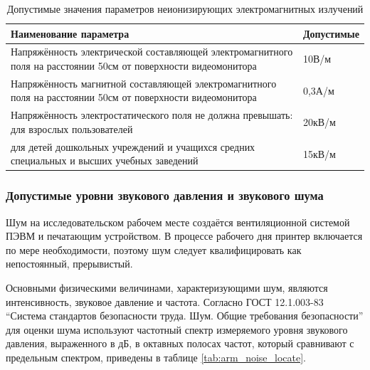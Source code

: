 \begin{table}[h]
\begin{longtable}[h!]{|m{}|m{}|}
\caption{Допустимые значения параметров неионизирующих электромагнитных излучений}
\label{tab:min_neoinige_elwave}
\\ \hline
Наименование параметра & Допустимые \\ \hline
Напряжённость электрической составляющей электромагнитного поля на расстоянии 50см от поверхности видеомонитора & 10В/м\\ \hline
Напряжённость магнитной составляющей электромагнитного поля на расстоянии 50см от поверхности видеомонитора & 0,3А/м\\ \hline
Напряжённость электростатического поля не должна превышать: для взрослых пользователей & 20кВ/м\\ \hline
для детей дошкольных учреждений и учащихся средних специальных и высших учебных заведений & 15кВ/м\\ \hline
\end{longtable}
\end{table}

\subsubsection{Допустимые уровни звукового давления и звукового шума}

Шум на исследовательском рабочем месте создаётся вентиляционной системой ПЭВМ и печатающим устройством. В процессе рабочего дня принтер включается по мере необходимости, поэтому шум следует квалифицировать как непостоянный, прерывистый.

Основными физическими величинами, характеризующими шум, являются интенсивность, звуковое давление и частота. Согласно ГОСТ 12.1.003-83 ``Система стандартов безопасности труда. Шум. Общие требования безопасности'' для оценки шума используют частотный спектр измеряемого уровня звукового давления, выраженного в дБ, в октавных полосах частот, который сравнивают с предельным спектром, приведены в таблице \ref{tab:arm_noise_locate}.

